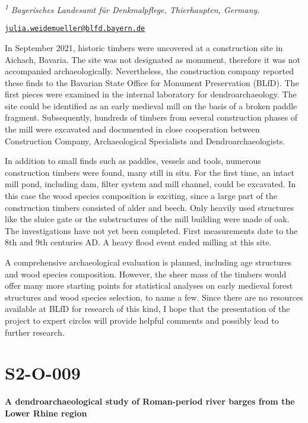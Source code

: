 \documentclass[
]{book}
\begin{document}
\textsuperscript{\emph{1}} \emph{Bayerisches Landesamt für Denkmalpflege, Thierhaupten, Germany.}

\href{mailto:julia.weidemueller@blfd.bayern.de}{\nolinkurl{julia.weidemueller@blfd.bayern.de}}

In September 2021, historic timbers were uncovered at a construction site in Aichach, Bavaria. The site was not designated as monument, therefore it was not accompanied archaeologically. Nevertheless, the construction company reported these finds to the Bavarian State Office for Monument Preservation (BLfD). The first pieces were examined in the internal laboratory for dendroarchaeology. The site could be identified as an early medieval mill on the basis of a broken paddle fragment. Subsequently, hundreds of timbers from several construction phases of the mill were excavated and documented in close cooperation between Construction Company, Archaeological Specialists and Dendroarchaeologists.

In addition to small finds such as paddles, vessels and tools, numerous construction timbers were found, many still in situ. For the first time, an intact mill pond, including dam, filter system and mill channel, could be excavated. In this case the wood species composition is exciting, since a large part of the construction timbers consisted of alder and beech. Only heavily used structures like the sluice gate or the substructures of the mill building were made of oak. The investigations have not yet been completed. First measurements date to the 8th and 9th centuries AD. A heavy flood event ended milling at this site.

A comprehensive archaeological evaluation is planned, including age structures and wood species composition. However, the sheer mass of the timbers would offer many more starting points for statistical analyses on early medieval forest structures and wood species selection, to name a few. Since there are no resources available at BLfD for research of this kind, I hope that the presentation of the project to expert circles will provide helpful comments and possibly lead to further research.

\hypertarget{s2-o-009}{%
\section*{S2-O-009}\label{s2-o-009}}

\textbf{A dendroarchaeological study of Roman-period river barges from the Lower Rhine region}
\end{document}
